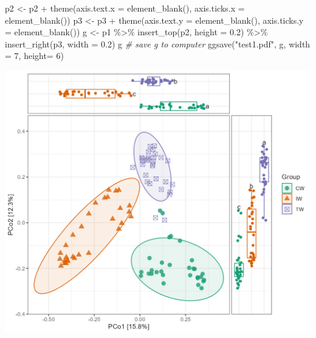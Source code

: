 \documentclass[
]{book}
\newenvironment{Shaded}{\begin{snugshade}}{\end{snugshade}}
\newcommand{\AttributeTok}[1]{\textcolor[rgb]{0.77,0.63,0.00}{#1}}
\newcommand{\CommentTok}[1]{\textcolor[rgb]{0.56,0.35,0.01}{\textit{#1}}}
\newcommand{\DecValTok}[1]{\textcolor[rgb]{0.00,0.00,0.81}{#1}}
\newcommand{\FloatTok}[1]{\textcolor[rgb]{0.00,0.00,0.81}{#1}}
\newcommand{\FunctionTok}[1]{\textcolor[rgb]{0.00,0.00,0.00}{#1}}
\newcommand{\NormalTok}[1]{#1}
\newcommand{\OtherTok}[1]{\textcolor[rgb]{0.56,0.35,0.01}{#1}}
\newcommand{\SpecialCharTok}[1]{\textcolor[rgb]{0.00,0.00,0.00}{#1}}
\newcommand{\StringTok}[1]{\textcolor[rgb]{0.31,0.60,0.02}{#1}}
\begin{document}
\begin{Shaded}
\begin{Highlighting}[]
\NormalTok{p2 }\OtherTok{\textless{}{-}}\NormalTok{ p2 }\SpecialCharTok{+} \FunctionTok{theme}\NormalTok{(}\AttributeTok{axis.text.x =} \FunctionTok{element\_blank}\NormalTok{(), }\AttributeTok{axis.ticks.x =} \FunctionTok{element\_blank}\NormalTok{())}
\NormalTok{p3 }\OtherTok{\textless{}{-}}\NormalTok{ p3 }\SpecialCharTok{+} \FunctionTok{theme}\NormalTok{(}\AttributeTok{axis.text.y =} \FunctionTok{element\_blank}\NormalTok{(), }\AttributeTok{axis.ticks.y =} \FunctionTok{element\_blank}\NormalTok{())}
\NormalTok{g }\OtherTok{\textless{}{-}}\NormalTok{ p1 }\SpecialCharTok{\%\textgreater{}\%} \FunctionTok{insert\_top}\NormalTok{(p2, }\AttributeTok{height =} \FloatTok{0.2}\NormalTok{) }\SpecialCharTok{\%\textgreater{}\%} \FunctionTok{insert\_right}\NormalTok{(p3, }\AttributeTok{width =} \FloatTok{0.2}\NormalTok{)}
\NormalTok{g}
\CommentTok{\# save g to computer}
\FunctionTok{ggsave}\NormalTok{(}\StringTok{"test1.pdf"}\NormalTok{, g, }\AttributeTok{width =} \DecValTok{7}\NormalTok{, }\AttributeTok{height=} \DecValTok{6}\NormalTok{)}
\end{Highlighting}
\end{Shaded}

\begin{center}\includegraphics[width=650px]{Images/Other_PCoA_boxplot2} \end{center}

  
\end{document}
